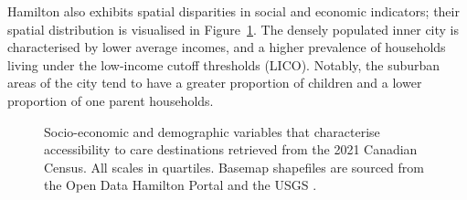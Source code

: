 \documentclass[
  authoryear,
  preprint,
  3p]{elsarticle}
\begin{document}
Hamilton also exhibits spatial disparities in social and economic
indicators; their spatial distribution is visualised in
Figure~\ref{fig-Fig2}. The densely populated inner city is characterised
by lower average incomes, and a higher prevalence of households living
under the low-income cutoff thresholds (LICO). Notably, the suburban
areas of the city tend to have a greater proportion of children and a
lower proportion of one parent households.

\begin{figure}


\caption{\label{fig-Fig2}Socio-economic and demographic variables that
characterise accessibility to care destinations retrieved from the 2021
Canadian Census. All scales in quartiles. Basemap shapefiles are sourced
from the Open Data Hamilton Portal
\citep{opendatahamiltonCityBoundary2023} and the USGS
\citep{greatlakesUSGS2010}.}

\end{figure}%
\end{document}
